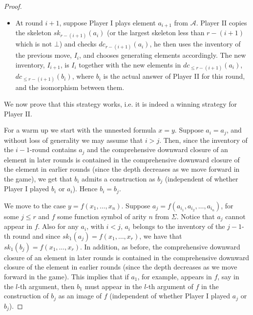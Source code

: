 \documentclass[a4paper,11pt]{article}
\begin{document}
\begin{proof}
\begin{itemize}
\item At round $i+1$, suppose Player I plays element $a_{i+1}$ from $\mathcal{A}$. Player II copies the skeleton $sk_{r-(i+1)}(a_i)$ (or the largest skeleton less than $r-(i+1)$ which is not $\bot$) and checks $dc_{r-(i+1)}(a_i)$, he then uses the inventory of the previous move, $I_i$, and chooses generating elements accordingly. The new inventory, $I_{i+1}$, is $I_i$ together with the new elements in $dc_{\leq r-(i+1)}(a_i)$, $dc_{\leq r-(i+1)}(b_i)$, where $b_i$ is the actual answer of Player II for this round, and the isomorphism between them.
\end{itemize}

We now prove that this strategy works, i.e. it is indeed a winning strategy for Player II.

For a warm up we start with the unnested formula $x=y$. Suppose $a_i=a_j$, and without loss of generality we may assume that $i>j$. Then, since the inventory of the $i-1$-round contains $a_j$ and the comprehensive downward closure of an element in later rounds is contained in the comprehensive downward closure of the element in earlier rounds (since the depth decreases as we move forward in the game), we get that $b_i$ admits a construction as $b_j$ (independent of whether Player I played $b_i$ or $a_i$). Hence $b_i=b_j$.   

We move to the case $y=f(x_1, \ldots, x_n)$. Suppose $a_j=f(a_{i_1}, a_{i_2}, \ldots, a_{i_n})$, for some $j\leq r$ and $f$ some function symbol of arity $n$ from $\Sigma$. Notice that $a_j$ cannot appear in $f$. Also for any $a_i$, with $i<j$, $a_i$ belongs to the inventory of the $j-1$-th round and since $sk_1(a_j)=f(x_1,\ldots,x_r)$, we have that $sk_1(b_j)=f(x_1, \ldots,x_r)$. In addition, as before, the comprehensive downward closure of an element in later rounds is contained in the comprehensive downward closure of the element in earlier rounds (since the depth decreases as we move forward in the game). This implies that if $a_1$, for example, appears in $f$, say in the $l$-th argument, then $b_1$ must appear in the $l$-th argument of $f$ in the construction of $b_j$ as an image of $f$ (independent of whether Player I played $a_j$ or $b_j$). 


\end{proof}
\end{document}
